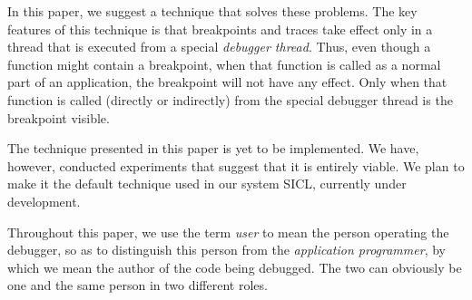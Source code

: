 In this paper, we suggest a technique that solves these problems.  The
key features of this technique is that breakpoints and traces take
effect only in a thread that is executed from a special \emph{debugger
  thread}.  Thus, even though a function might contain a breakpoint,
when that function is called as a normal part of an application, the
breakpoint will not have any effect.  Only when that function is
called (directly or indirectly) from the special debugger thread is
the breakpoint visible.

The technique presented in this paper is yet to be implemented.  We
have, however, conducted experiments that suggest that it is entirely
viable.  We plan to make it the default technique used in our system
SICL, currently under development.

Throughout this paper, we use the term \emph{user} to mean the person
operating the debugger, so as to distinguish this person from the
\emph{application programmer}, by which we mean the author of the code
being debugged.  The two can obviously be one and the same person in
two different roles.
